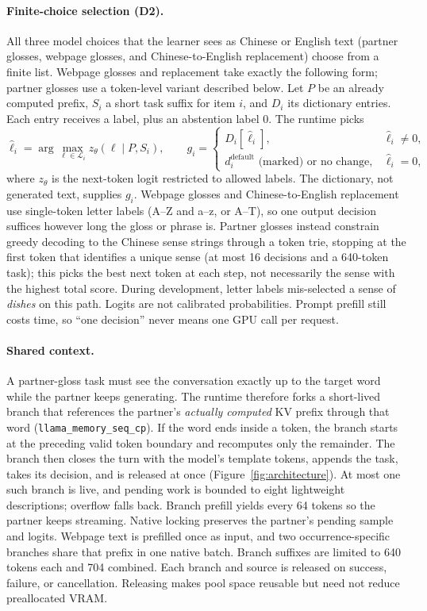 \documentclass[11pt,a4paper]{article}
\newcommand{\code}[1]{\texttt{#1}}
\begin{document}
\paragraph{Finite-choice selection (D2).} All three model choices that the learner sees as Chinese or English text (partner glosses, webpage glosses, and Chinese-to-English replacement) choose from a finite list. Webpage glosses and replacement take exactly the following form; partner glosses use a token-level variant described below. Let $P$ be an already computed prefix, $S_i$ a short task suffix for item $i$, and $D_i$ its dictionary entries. Each entry receives a label, plus an abstention label $0$. The runtime picks
\begin{equation}
 \hat{\ell}_i = \arg\max_{\ell\in\mathcal L_i} z_\theta(\ell\mid P,S_i),\qquad
 g_i = \begin{cases}D_i[\hat{\ell}_i],&\hat{\ell}_i\ne0,\\ d_i^{\mathrm{default}} \text{ (marked) or no change},&\hat{\ell}_i=0,\end{cases}
\end{equation}
where $z_\theta$ is the next-token logit restricted to allowed labels. The dictionary, not generated text, supplies $g_i$. Webpage glosses and Chinese-to-English replacement use single-token letter labels (A--Z and a--z, or A--T), so one output decision suffices however long the gloss or phrase is. Partner glosses instead constrain greedy decoding to the Chinese sense strings through a token trie, stopping at the first token that identifies a unique sense (at most 16 decisions and a 640-token task); this picks the best next token at each step, not necessarily the sense with the highest total score. During development, letter labels mis-selected a sense of \emph{dishes} on this path. Logits are not calibrated probabilities. Prompt prefill still costs time, so ``one decision'' never means one GPU call per request.

\paragraph{Shared context.} A partner-gloss task must see the conversation exactly up to the target word while the partner keeps generating. The runtime therefore forks a short-lived branch that references the partner's \emph{actually computed} KV prefix through that word (\code{llama\_memory\_seq\_cp}). If the word ends inside a token, the branch starts at the preceding valid token boundary and recomputes only the remainder. The branch then closes the turn with the model's template tokens, appends the task, takes its decision, and is released at once (Figure~\ref{fig:architecture}). At most one such branch is live, and pending work is bounded to eight lightweight descriptions; overflow falls back. Branch prefill yields every 64 tokens so the partner keeps streaming. Native locking preserves the partner's pending sample and logits. Webpage text is prefilled once as input, and two occurrence-specific branches share that prefix in one native batch. Branch suffixes are limited to 640 tokens each and 704 combined. Each branch and source is released on success, failure, or cancellation. Releasing makes pool space reusable but need not reduce preallocated VRAM.
\end{document}
